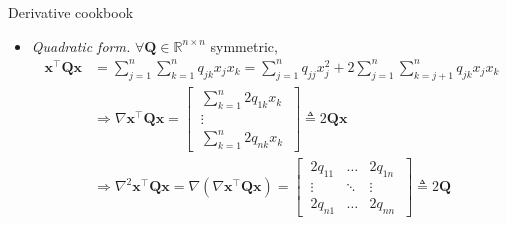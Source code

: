 \documentclass{beamer}
\numberwithin{equation}{section}
\begin{document}
\begin{frame}{Derivative cookbook}
    \begin{itemize} 
        \item
        \textit{Quadratic form.} $ \forall \mathbf{Q} \in
        \mathbb{R}^{n \times n} $ symmetric,
        \begin{equation*}
            \begin{split}
                \mathbf{x}^\top\mathbf{Qx} & = \sum_{j = 1}^n\sum_{k = 1}^n
	                q_{jk}x_jx_k = \sum_{j = 1}^nq_{jj}x_j^2 +
	                2\sum_{j = 1}^n\sum_{k = j + 1}^nq_{jk}x_jx_k \\      
                & \Rightarrow \nabla \mathbf{x}^\top\mathbf{Qx} =
                \begin{bmatrix}
	                \ \sum_{k = 1}^n2q_{1k}x_k \ \\ \ \vdots \ \\
	                \ \sum_{k = 1}^n2q_{nk}x_k \
	            \end{bmatrix} \triangleq 2\mathbf{Qx} \\
	            & \Rightarrow \nabla^2\mathbf{x}^\top\mathbf{Qx} =
	            \nabla\left(\nabla\mathbf{x}^\top\mathbf{Qx}\right) =
	            \begin{bmatrix}
                    \ 2q_{11} & \ldots & 2q_{1n} \ \\
                    \ \vdots & \ddots & \vdots \ \\
                    \ 2q_{n1} & \ldots & 2q_{nn} \
                \end{bmatrix} \triangleq 2\mathbf{Q}
            \end{split}
        \end{equation*}
    \end{itemize}
\end{frame}
\end{document}
